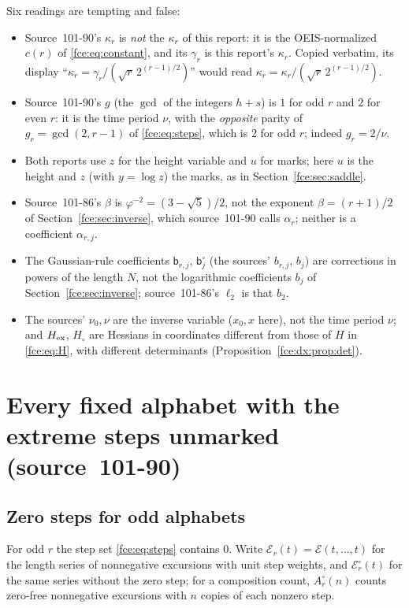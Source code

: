 \documentclass[11pt,a4paper]{article}
\numberwithin{equation}{section}
\theoremstyle{definition}\newtheorem{definition}[theorem]{Definition}
\theoremstyle{remark}\newtheorem{remark}[theorem]{Remark}
\newcommand{\E}{\mathcal E}
\begin{document}
Six readings are tempting and false:
\begin{itemize}
\item Source~101-90's $\kappa_r$ is \emph{not} the $\kappa_r$ of this report: it
is the OEIS-normalized $c(r)$ of \eqref{fce:eq:constant}, and its $\gamma_r$ is
this report's $\kappa_r$. Copied verbatim, its display
``$\kappa_r=\gamma_r/(\sqrt r\,2^{(r-1)/2})$'' would read
$\kappa_r=\kappa_r/(\sqrt r\,2^{(r-1)/2})$.
\item Source~101-90's $g$ (the $\gcd$ of the integers $h+s$) is $1$ for odd
$r$ and $2$ for even $r$: it is the time period $\nu$, with the
\emph{opposite} parity of $g_r=\gcd(2,r-1)$ of \eqref{fce:eq:steps}, which is
$2$ for odd $r$; indeed $g_r=2/\nu$.
\item Both reports use $z$ for the height variable and $u$ for marks; here
$u$ is the height and $z$ (with $y=\log z$) the marks, as in
Section~\ref{fce:sec:saddle}.
\item Source~101-86's $\beta$ is $\varphi^{-2}=(3-\sqrt5)/2$, not the exponent
$\beta=(r+1)/2$ of Section~\ref{fce:sec:inverse}, which source~101-90 calls
$\alpha_r$; neither is a coefficient $\alpha_{r,j}$.
\item The Gaussian-rule coefficients $\mathsf b_{r,j}$, $\mathsf b^\circ_j$
(the sources' $b_{r,j}$, $b_j$) are corrections in powers of the length $N$,
not the logarithmic coefficients $b_j$ of Section~\ref{fce:sec:inverse};
source~101-86's $\ell_2$ is that $b_2$.
\item The sources' $\nu_0,\nu$ are the inverse variable ($x_0,x$ here), not
the time period $\nu$; and $H_{\rm ex}$, $H_\circ$ are Hessians in
coordinates different from those of $H$ in \eqref{fce:eq:H}, with different
determinants (Proposition~\ref{fce:dx:prop:det}).
\end{itemize}

\section{Every fixed alphabet with the extreme steps unmarked (source~101-90)}\label{fce:dx:sec:alphabet}
\subsection{Zero steps for odd alphabets}\label{fce:dx:sec:zero}
For odd $r$ the step set \eqref{fce:eq:steps} contains $0$. Write
$\E_r(t)=\E(t,\ldots,t)$ for the length series of nonnegative excursions with
unit step weights, and $\E^\circ_r(t)$ for the same series without the zero
step; for a composition count, $A^\circ_r(n)$ counts zero-free nonnegative
excursions with $n$ copies of each nonzero step.
\end{document}
